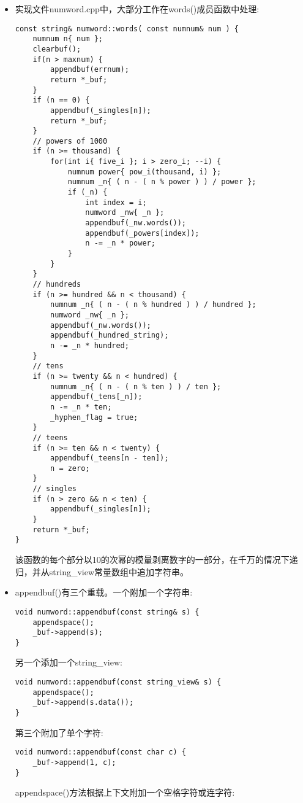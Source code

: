 \begin{itemize}
\item 
实现文件numword.cpp中，大部分工作在words()成员函数中处理:

\begin{lstlisting}[style=styleCXX]
const string& numword::words( const numnum& num ) {
	numnum n{ num };
	clearbuf();
	if(n > maxnum) {
		appendbuf(errnum);
		return *_buf;
	}
	if (n == 0) {
		appendbuf(_singles[n]);
		return *_buf;
	}
	// powers of 1000
	if (n >= thousand) {
		for(int i{ five_i }; i > zero_i; --i) {
			numnum power{ pow_i(thousand, i) };
			numnum _n{ ( n - ( n % power ) ) / power };
			if (_n) {
				int index = i;
				numword _nw{ _n };
				appendbuf(_nw.words());
				appendbuf(_powers[index]);
				n -= _n * power;
			}
		}
	}
	// hundreds
	if (n >= hundred && n < thousand) {
		numnum _n{ ( n - ( n % hundred ) ) / hundred };
		numword _nw{ _n };
		appendbuf(_nw.words());
		appendbuf(_hundred_string);
		n -= _n * hundred;
	}
	// tens
	if (n >= twenty && n < hundred) {
		numnum _n{ ( n - ( n % ten ) ) / ten };
		appendbuf(_tens[_n]);
		n -= _n * ten;
		_hyphen_flag = true;
	}
	// teens
	if (n >= ten && n < twenty) {
		appendbuf(_teens[n - ten]);
		n = zero;
	}
	// singles
	if (n > zero && n < ten) {
		appendbuf(_singles[n]);
	}
	return *_buf;
}
\end{lstlisting}

该函数的每个部分以10的次幂的模量剥离数字的一部分，在千万的情况下递归，并从string\_view常量数组中追加字符串。

\item 
appendbuf()有三个重载。一个附加一个字符串:

\begin{lstlisting}[style=styleCXX]
void numword::appendbuf(const string& s) {
	appendspace();
	_buf->append(s);
}
\end{lstlisting}

另一个添加一个string\_view:

\begin{lstlisting}[style=styleCXX]
void numword::appendbuf(const string_view& s) {
	appendspace();
	_buf->append(s.data());
}
\end{lstlisting}

第三个附加了单个字符:

\begin{lstlisting}[style=styleCXX]
void numword::appendbuf(const char c) {
	_buf->append(1, c);
}
\end{lstlisting}

appendspace()方法根据上下文附加一个空格字符或连字符:


\end{itemize}
